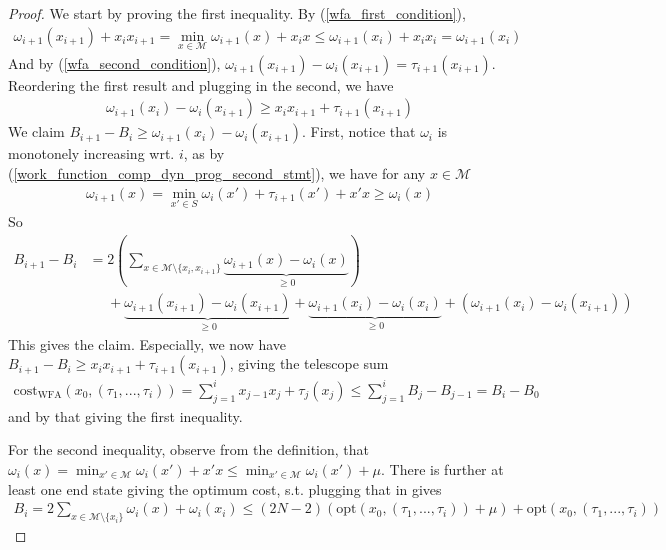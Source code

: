 \documentclass[10pt]{amsart}
\theoremstyle{definition}
\theoremstyle{remark}
\begin{document}
    \begin{proof}
        We start by proving the first inequality. By (\ref{wfa_first_condition}),
        \begin{align}
            \omega_{i+1}(x_{i+1})+x_ix_{i+1} = \min_{x \in \mathcal{M}} \omega_{i+1}(x)+x_ix \leq \omega_{i+1}(x_i) + x_ix_i = \omega_{i+1}(x_i)
        \end{align}
        And by (\ref{wfa_second_condition}), \(\omega_{i+1}(x_{i+1})-\omega_i(x_{i+1}) = \tau_{i+1}(x_{i+1})\). Reordering the first result and plugging in the second, we have
        \begin{align}
            \omega_{i+1}(x_i)-\omega_i(x_{i+1}) \geq x_ix_{i+1} + \tau_{i+1}(x_{i+1})
        \end{align}
        We claim \(B_{i+1} - B_i \geq \omega_{i+1}(x_i)-\omega_i(x_{i+1})\). First, notice that \(\omega_i\) is monotonely increasing wrt. \(i\), as by (\ref{work_function_comp_dyn_prog_second_stmt}), we have for any \(x \in \mathcal{M}\)
        \begin{align}
            \omega_{i+1}(x) = \min_{x' \in S} \omega_i(x')+\tau_{i+1}(x') + x'x \geq \omega_i(x)
        \end{align}
        So
        \begin{align}
            B_{i+1}-B_i &= 2 \left(\sum_{x \in \mathcal{M} \setminus \{x_i, x_{i+1}\}} \underbrace{\omega_{i+1}(x)-\omega_{i}(x)}_{\geq 0}\right)\\
            &\phantom{\geq}+ \underbrace{\omega_{i+1}(x_{i+1}) - \omega_{i}(x_{i+1})}_{\geq 0} + \underbrace{\omega_{i+1}(x_i) - \omega_{i}(x_i)}_{\geq 0} + (\omega_{i+1}(x_i) - \omega_i(x_{i+1}))
        \end{align}
        This gives the claim. Especially, we now have \(B_{i+1}-B_i \geq x_ix_{i+1}+\tau_{i+1}(x_{i+1})\), giving the telescope sum
        \begin{align}
            \text{cost}_{\text{WFA}}(x_0, (\tau_1, ..., \tau_i)) = \sum_{j=1}^i x_{j-1}x_j + \tau_j(x_j) \leq \sum_{j=1}^i B_j-B_{j-1} = B_i - B_0
        \end{align}
        and by that giving the first inequality.

        For the second inequality, observe from the definition, that \(\omega_i(x) = \min_{x' \in \mathcal{M}} \omega_i(x') + x'x \leq \min_{x' \in \mathcal{M}} \omega_i(x') + \mu\). There is further at least one end state giving the optimum cost, s.t. plugging that in gives
        \begin{align}
            B_i = 2\sum_{x \in \mathcal{M} \setminus \{x_i\}} \omega_i(x) + \omega_i(x_i) \leq (2N-2) (\text{opt}(x_0, (\tau_1, ..., \tau_i)) + \mu) + \text{opt}(x_0, (\tau_1, ..., \tau_i))
        \end{align}
    \end{proof}
\end{document}
